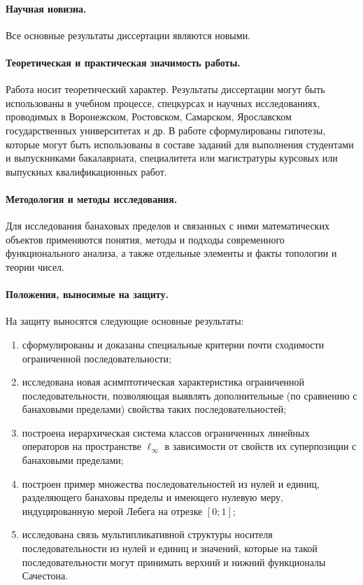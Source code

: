 \paragraph{Научная новизна.}
Все основные результаты диссертации являются новыми.


\paragraph{Теоретическая и практическая значимость работы.}
Работа носит теоретический характер.
Результаты диссертации могут быть использованы в учебном процессе, спецкурсах и научных исследованиях,
проводимых в Воронежском, Ростовском, Самарском, Ярославском государственных университетах и др.
В работе сформулированы гипотезы,
которые могут быть использованы в составе заданий для выполнения
студентами и выпускниками бакалавриата, специалитета или магистратуры
курсовых или выпускных квалификационных работ.





\paragraph{Методология и методы исследования.}
Для исследования банаховых пределов и связанных с ними математических объектов применяются
понятия, методы и подходы современного функционального анализа,
а также отдельные элементы и факты топологии и теории чисел.

\paragraph{Положения, выносимые на защиту.}
На защиту выносятся следующие основные результаты:
\begin{enumerate}
	\item
		сформулированы и доказаны специальные критерии почти сходимости
		ограниченной последовательности;
	\item
		исследована новая асимптотическая характеристика ограниченной последовательности,
		позволяющая выявлять дополнительные (по сравнению с банаховыми пределами)
		свойства таких последовательностей;
	\item
		построена иерархическая система классов ограниченных линейных операторов
		на пространстве $\ell_\infty$ в зависимости от свойств их суперпозиции с банаховыми пределами;
	\item
		построен пример множества последовательностей из нулей и единиц, разделяющего банаховы пределы
		и имеющего нулевую меру, индуцированную мерой Лебега на отрезке $[0;1]$;
	\item
		исследована связь мультипликативной структуры носителя последовательности из нулей и единиц
		и значений, которые на такой последовательности могут принимать верхний и нижний функционалы Сачестона.
\end{enumerate}



